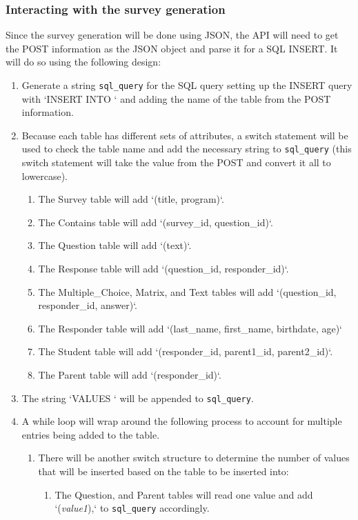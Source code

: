 \documentclass[letterpaper,10pt,serif, draftclsnofoot,onecolumn, compsoc, titlepage]{IEEEtran}
\begin{document}
\subsubsection{Interacting with the survey generation}
Since the survey generation will be done using JSON, the API will need to get the POST information as the JSON object and parse it for a SQL INSERT.
It will do so using the following design:
\begin{enumerate}
	\item Generate a string \texttt{sql\_query} for the SQL query setting up the INSERT query with `INSERT INTO ` and adding the name of the table from the POST information.
	\item Because each table has different sets of attributes, a switch statement will be used to check the table name and add the necessary string to \texttt{sql\_query} (this switch statement will take the value from the POST and convert it all to lowercase).
	\begin{enumerate}
		\item The Survey table will add `(title, program)`.
		\item The Contains table will add `(survey\_id, question\_id)`.
		\item The Question table will add `(text)`.
		\item The Response table will add `(question\_id, responder\_id)`.
		\item The Multiple\_Choice, Matrix, and Text tables will add `(question\_id, responder\_id, answer)`.
		\item The Responder table will add `(last\_name, first\_name, birthdate, age)`
		\item The Student table will add `(responder\_id, parent1\_id, parent2\_id)`.
		\item The Parent table will add `(responder\_id)`.
	\end{enumerate}
	\item The string `VALUES ` will be appended to \texttt{sql\_query}.
	\item A while loop will wrap around the following process to account for multiple entries being added to the table.
	\begin{enumerate}
		\item There will be another switch structure to determine the number of values that will be inserted based on the table to be inserted into:
		\begin{enumerate}
			\item The Question, and Parent tables will read one value and add `(\emph{value1}),` to \texttt{sql\_query} accordingly.

\end{enumerate}
\end{enumerate}
\end{enumerate}
\end{document}
